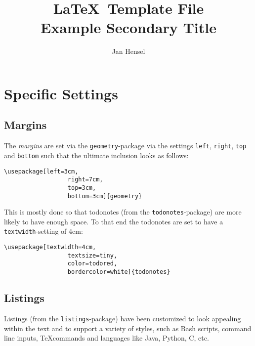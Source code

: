 \documentclass{article}
\author{Jan Hensel}
\title{\textbf{\LaTeX\ \textsf{Template} File}\\
        Example Secondary Title}
\begin{document}
\maketitle


\section{Specific Settings}
  \subsection{Margins}
    The \textit{margins} are set via the \texttt{geometry}-package via the settings
    \texttt{left}, \texttt{right}, \texttt{top} and \texttt{bottom} such that
    the ultimate inclusion looks as follows: 
    \begin{lstlisting}[style=latex,gobble=6]
      \usepackage[left=3cm,
                  right=7cm,
                  top=3cm,
                  bottom=3cm]{geometry}
    \end{lstlisting}
    This is mostly done so that todonotes (from the \texttt{todonotes}-package)
    are more likely to have enough space. To that end the todonotes are set to
    have a \texttt{textwidth}-setting of 4cm: 
    \begin{lstlisting}[style=latex,gobble=6]
      \usepackage[textwidth=4cm,
                  textsize=tiny,
                  color=todored,
                  bordercolor=white]{todonotes}
    \end{lstlisting}

  \subsection{Listings}
    Listings (from the \texttt{listings}-package) have been customized to look
    appealing within the text and to support a variety of styles, such as Bash
    scripts, command line inputs, \TeX commands and languages like Java,
    Python, C, etc. 
\end{document}
